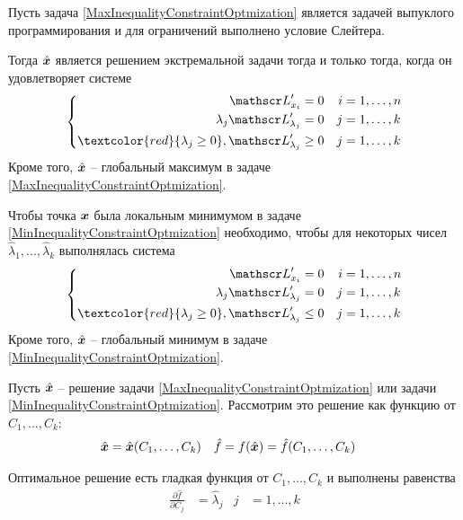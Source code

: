 \begin{teorema}
Пусть задача \eqref{MaxInequalityConstraintOptmization} 
является задачей выпуклого программирования и для ограничений выполнено условие Слейтера.

Тогда $\hat{{\bm x}}$ является решением экстремальной 
задачи тогда и только тогда, когда он удовлетворяет системе 
\begin{equation}\label{MaxInequalityConstraitNecessarySystem}
	\left\{\begin{aligned}
		\Lagrange'_{x_i}&=0 & i&=1,\ldots,n \\
		\lambda_j\Lagrange'_{\lambda_j} &=0 & j&=1,\ldots,k \\
		\textcolor{red}{\lambda_j\geq 0},\Lagrange'_{\lambda_j}&\geq0 & j&=1,\ldots,k 
	\end{aligned}\right.
\end{equation}
Кроме того, $\hat{{\bm x}}$ -- глобальный максимум в задаче  \eqref{MaxInequalityConstraintOptmization}.
\end{teorema}
\begin{col}%
Чтобы точка ${\bm x}$ была локальным минимумом в задаче \eqref{MinInequalityConstraintOptmization}
необходимо, чтобы для некоторых чисел $\hat{\lambda}_1,...,\hat{\lambda}_k$ выполнялась  
система
\begin{equation}\label{MinInequalityConstraitNecessarySystem}
	\left\{\begin{aligned}
		\Lagrange'_{x_i}&=0 & i&=1,\ldots,n \\
		\lambda_j\Lagrange'_{\lambda_j} &=0 & j&=1,\ldots,k \\
		\textcolor{red}{\lambda_j\geq 0},\Lagrange'_{\lambda_j}&\leq0 & j&=1,\ldots,k
	\end{aligned}\right.
\end{equation}
Кроме того, $\hat{{\bm x}}$ -- глобальный минимум в задаче  \eqref{MinInequalityConstraintOptmization}.
\end{col}
Пусть $\hat{{\bm x}}$ -- решение
задачи \eqref{MaxInequalityConstraintOptmization} или задачи 
\eqref{MinInequalityConstraintOptmization}.
Рассмотрим это решение как функцию от $C_1,\ldots,C_k$:
\begin{align*}
	\hat{{\bm x}}&=\hat{{\bm x}}(C_1,\ldots,C_k) &
	\hat{f}&=f(\hat{{\bm x}})=\hat{f}(C_1,\ldots,C_k)
\end{align*}
\begin{teorema}
Оптимальное решение есть гладкая функция от $C_1,\ldots,C_k$ и выполнены равенства
\begin{align*}
	\frac{\partial \hat{f}}{\partial C_j}&=\hat{\lambda}_j & j&=1,\ldots,k
\end{align*}
\end{teorema}


